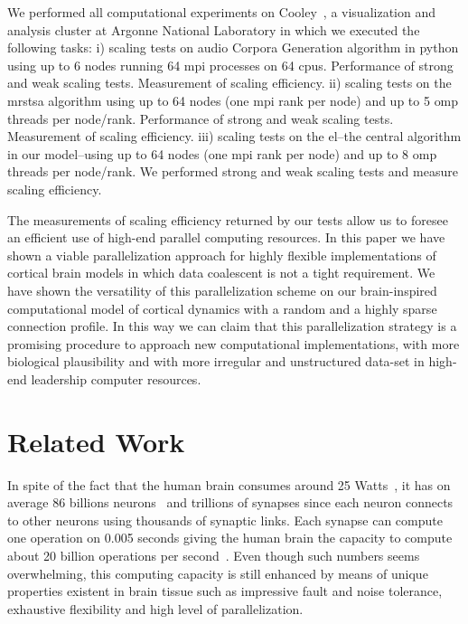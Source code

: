 \documentclass[10pt,journal,compsoc]{IEEEtran}
\begin{document}
We performed all computational experiments on Cooley~\cite{noauthor_cooley_nodate}, a visualization and analysis cluster at Argonne National Laboratory in which we executed the following tasks: i) scaling tests on audio Corpora Generation algorithm in python using up to 6 nodes running 64 \gls{mpi} processes on 64 \glspl{cpu}. Performance of strong and weak scaling tests. Measurement of scaling efficiency. ii) scaling tests on the \gls{mrstsa} algorithm using up to 64 nodes (one \gls{mpi} rank per node) and up to 5 \gls{omp} threads per node/rank. Performance of strong and weak scaling tests. Measurement of scaling efficiency. iii) scaling tests on the \gls{el}--the central algorithm in our model--using up to 64 nodes (one \gls{mpi} rank per node) and up to 8 \gls{omp} threads per node/rank. We performed strong and weak scaling tests and measure scaling efficiency. 

The measurements of scaling efficiency returned by our tests allow us to foresee an efficient use of high-end parallel computing resources. In this paper we have shown a viable parallelization approach for highly flexible implementations of cortical brain models in which data coalescent is not a tight requirement. We have shown the versatility of this parallelization scheme on our brain-inspired computational model of cortical dynamics with a random and a highly sparse connection profile. In this way we can claim that this parallelization strategy is a promising procedure to approach new computational implementations, with more biological plausibility and with more irregular and unstructured data-set in high-end leadership computer resources.


















\section{Related Work}

In spite of the fact that the human brain consumes around 25 Watts~\cite{edited_by_stephen_c._cunnane_human_2010}, it has on average 86 billions neurons~\cite{Azevedo2009EqualNO} and trillions of synapses since each neuron connects to other neurons using thousands of synaptic links. Each synapse can compute one operation on 0.005 seconds giving the human brain the capacity to compute about 20 billion operations per second~\cite{10.2307/j.ctt5vkr1h}. Even though such numbers seems overwhelming, this computing capacity is still enhanced by means of unique properties existent in brain tissue such as impressive fault and noise tolerance, exhaustive flexibility and high level of parallelization.
\end{document}
